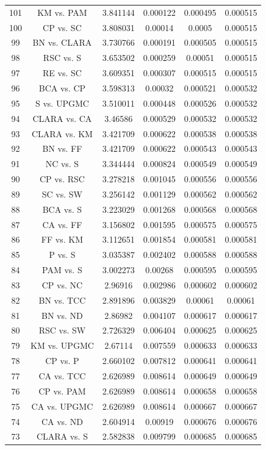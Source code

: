 \documentclass[a4paper,10pt]{article}
\begin{document}
\begin{landscape}
\begin{table}[!htp]
\begin{tabular}{cccccc}
101&KM vs. PAM&3.841144&0.000122&0.000495&0.000515\\
100&CP vs. SC&3.808031&0.00014&0.0005&0.000515\\
99&BN vs. CLARA&3.730766&0.000191&0.000505&0.000515\\
98&RSC vs. S&3.653502&0.000259&0.00051&0.000515\\
97&RE vs. SC&3.609351&0.000307&0.000515&0.000515\\
96&BCA vs. CP&3.598313&0.00032&0.000521&0.000532\\
95&S vs. UPGMC&3.510011&0.000448&0.000526&0.000532\\
94&CLARA vs. CA&3.46586&0.000529&0.000532&0.000532\\
93&CLARA vs. KM&3.421709&0.000622&0.000538&0.000538\\
92&BN vs. FF&3.421709&0.000622&0.000543&0.000543\\
91&NC vs. S&3.344444&0.000824&0.000549&0.000549\\
90&CP vs. RSC&3.278218&0.001045&0.000556&0.000556\\
89&SC vs. SW&3.256142&0.001129&0.000562&0.000562\\
88&BCA vs. S&3.223029&0.001268&0.000568&0.000568\\
87&CA vs. FF&3.156802&0.001595&0.000575&0.000575\\
86&FF vs. KM&3.112651&0.001854&0.000581&0.000581\\
85&P vs. S&3.035387&0.002402&0.000588&0.000588\\
84&PAM vs. S&3.002273&0.00268&0.000595&0.000595\\
83&CP vs. NC&2.96916&0.002986&0.000602&0.000602\\
82&BN vs. TCC&2.891896&0.003829&0.00061&0.00061\\
81&BN vs. ND&2.86982&0.004107&0.000617&0.000617\\
80&RSC vs. SW&2.726329&0.006404&0.000625&0.000625\\
79&KM vs. UPGMC&2.67114&0.007559&0.000633&0.000633\\
78&CP vs. P&2.660102&0.007812&0.000641&0.000641\\
77&CA vs. TCC&2.626989&0.008614&0.000649&0.000649\\
76&CP vs. PAM&2.626989&0.008614&0.000658&0.000658\\
75&CA vs. UPGMC&2.626989&0.008614&0.000667&0.000667\\
74&CA vs. ND&2.604914&0.00919&0.000676&0.000676\\
73&CLARA vs. S&2.582838&0.009799&0.000685&0.000685\\

\end{tabular}
\end{table}
\end{landscape}
\end{document}
